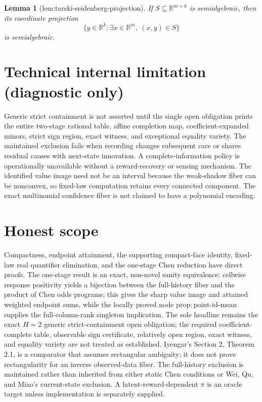 \documentclass{article}
\newtheorem{lemma}{Lemma}
\begin{document}
\begin{lemma}[lem:tarski-seidenberg-projection]\label{lem:tarski-seidenberg-projection}
If \(S\subseteq\mathbb R^{m+k}\) is semialgebraic, then its coordinate projection
\[
\{y\in\mathbb R^k:\exists x\in\mathbb R^m,\ (x,y)\in S\}
\]
is semialgebraic.
\end{lemma}

\section*{Technical internal limitation (diagnostic only)}

Generic strict containment is not asserted until the single open obligation prints the entire two-stage rational table, affine completion map, coefficient-expanded minors, strict sign region, exact witness, and exceptional equality variety. The maintained exclusion fails when recording changes subsequent care or shares residual causes with next-state innovation. A complete-information policy is operationally unavailable without a reward-recovery or sensing mechanism. The identified value image need not be an interval because the weak-shadow fiber can be nonconvex, so fixed-law computation retains every connected component. The exact multinomial confidence fiber is not claimed to have a polynomial encoding.

\section{Honest scope}

Compactness, endpoint attainment, the supporting compact-face identity, fixed-law real quantifier elimination, and the one-stage Chen reduction have direct proofs. The one-stage result is an exact, non-novel sanity equivalence: cellwise response positivity yields a bijection between the full-history fiber and the product of Chen odds programs; this gives the sharp value image and attained weighted endpoint sums, while the locally proved node \(\mathrm{prop{:}point\text{-}id\text{-}mean}\) supplies the full-column-rank singleton implication. The sole headline remains the exact \(H=2\) generic strict-containment open obligation; the required coefficient-complete table, observable sign certificate, relatively open region, exact witness, and equality variety are not treated as established. Iyengar's Section 2, Theorem 2.1, is a comparator that assumes rectangular ambiguity; it does not prove rectangularity for an inverse observed-data fiber. The full-history exclusion is maintained rather than inherited from either static Chen conditions or Wei, Qu, and Miao's current-state exclusion. A latent-reward-dependent \(\pi\) is an oracle target unless implementation is separately supplied.
\end{document}
